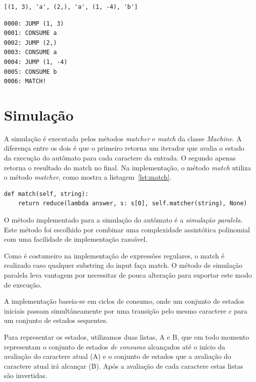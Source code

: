 \documentclass[a4paper,12pt,oneside,onecolumn]{uerj}
\begin{document}
{
  \lstset{%
    basicstyle=\ttfamily\normalsize,
  }
\begin{lstlisting}[caption={Representação do autômato como array},label=lst:automaton_array]
	[(1, 3), 'a', (2,), 'a', (1, -4), 'b']
\end{lstlisting}
}

{
  \lstset{%
    basicstyle=\ttfamily\normalsize,
  }
\begin{lstlisting}[caption={Representação do autômato como instruções},label=lst:automaton_instr]
0000: JUMP (1, 3)
0001: CONSUME a
0002: JUMP (2,)
0003: CONSUME a
0004: JUMP (1, -4)
0005: CONSUME b
0006: MATCH!
\end{lstlisting}
}


\section{Simulação}

A simulação é executada pelos métodos \emph{matcher} e \emph{match} da classe \emph{Machine}. A diferença entre os dois é que o primeiro retorna um iterador que avalia o estado da execução do autômato para cada caractere da entrada. O segundo apenas retorna o resultado do match no final. Na implementação, o método \emph{match} utiliza o método \emph{matcher}, como mostra a listagem~\ref{lst:match}.

\vspace{0.5cm}
\begin{lstlisting}[caption={Implementação do método \emph{match}},label=lst:match]
def match(self, string):
    return reduce(lambda answer, s: s[0], self.matcher(string), None)
\end{lstlisting}

O método implementado para a simulação do autômato é a \emph{simulação paralela}. Este método foi escolhido por combinar uma complexidade assintótica polinomial com uma facilidade de implementação razoável.

Como é costumeiro na implementação de expressões regulares, o match é realizado caso qualquer substring do input faça match. O método de simulação paralela leva vantagem por necessitar de pouca alteração para suportar este modo de execução.

A implementação baseia-se em ciclos de consumo, onde um conjunto de estados iniciais passam simultâneamente por uma transição pelo mesmo caractere $c$ para um conjunto de estados sequentes.

Para representar os estados, utilizamos duas listas, A e B, que em todo momento representam o conjunto de estados \emph{de consumo} alcançados até o início da avaliação do caractere atual (A) e o conjunto de estados que a avaliação do caractere atual irá alcançar (B). Após a avaliação de cada caractere estas listas são invertidas. 
\end{document}
